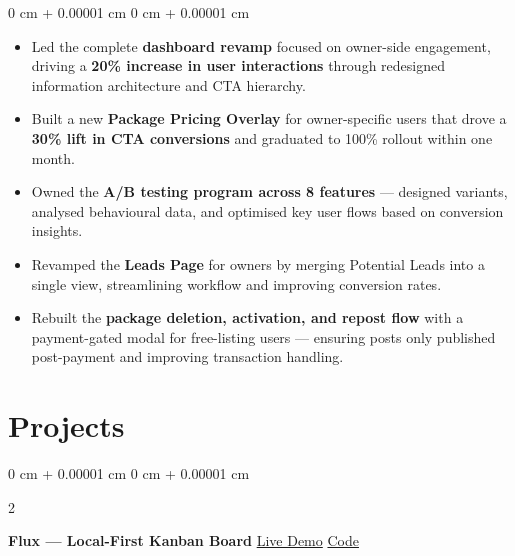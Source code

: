 \documentclass[10pt, letterpaper]{article}
\newenvironment{highlights}{
    \begin{itemize}[
        topsep=0.10 cm,
        parsep=0.10 cm,
        partopsep=0pt,
        itemsep=0pt,
        leftmargin=0 cm + 10pt
    ]
}{
    \end{itemize}
} %
\newenvironment{onecolentry}{
    \begin{adjustwidth}{
        0 cm + 0.00001 cm
    }{
        0 cm + 0.00001 cm
    }
}{
    \end{adjustwidth}
} %
\newenvironment{twocolentry}[2][]{
    \onecolentry
    \def\secondColumn{#2}
    \setcolumnwidth{\fill, 4.5 cm}
    \begin{paracol}{2}
}{
    \switchcolumn \raggedleft \secondColumn
    \end{paracol}
    \endonecolentry
} %
\let\hrefWithoutArrow\href
\begin{document}
        \vspace{0.10 cm}
        \begin{onecolentry}
            \begin{highlights}
    \item Led the complete \textbf{dashboard revamp} focused on owner-side engagement, driving a \textbf{20\% increase in user interactions} through redesigned information architecture and CTA hierarchy.

    \item Built a new \textbf{Package Pricing Overlay} for owner-specific users that drove a \textbf{30\% lift in CTA conversions} and graduated to 100\% rollout within one month.

    \item Owned the \textbf{A/B testing program across 8 features} — designed variants, analysed behavioural data, and optimised key user flows based on conversion insights.

    \item Revamped the \textbf{Leads Page} for owners by merging Potential Leads into a single view, streamlining workflow and improving conversion rates.

    \item Rebuilt the \textbf{package deletion, activation, and repost flow} with a payment-gated modal for free-listing users — ensuring posts only published post-payment and improving transaction handling.

            \end{highlights}
        \end{onecolentry}



    \section{Projects}

        \vspace{0.30 cm}
        \begin{twocolentry}{
            \hrefWithoutArrow{https://kamal-rohilla-kanban-board.vercel.app}{Live Demo} \enspace \hrefWithoutArrow{https://github.com/Kamal77-coder/kanban-board}{Code}
        }
            \textbf{Flux — Local-First Kanban Board}\end{twocolentry}
\end{document}
